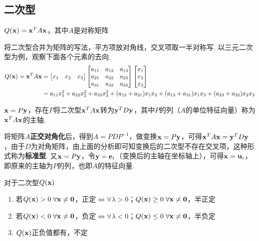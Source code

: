 \subsection{二次型}
\begin{definition}[二次型]
$Q(\mathbf{x})=\mathbf{x}^TA\mathbf{x}$，其中$A$是对称矩阵
\end{definition}
将二次型合并为矩阵的写法，平方项放对角线，交叉项取一半对称写. 以三元二次型为例，观察下面各个元素的去向.
\[\begin{aligned}Q(\mathbf{x})=\mathbf{x}^TA\mathbf{x}&=\begin{bmatrix}x_1&x_2&x_3\end{bmatrix}\begin{bmatrix}a_{11}&a_{12}&a_{13}\\a_{21}&a_{22}&a_{23}\\a_{31}&a_{32}&a_{33}\end{bmatrix}\begin{bmatrix}x_1\\x_2\\x_3\end{bmatrix}\\
&=a_{11}x_1^2+a_{22}x_2^2+a_{33}x_3^2+(a_{12}+a_{21})x_1x_2+(a_{13}+a_{31})x_1x_3+(a_{23}+a_{32})x_2x_3\end{aligned}\]
\begin{theorem}[主轴定理]
$\mathbf{x}=P\mathbf{y}$，存在$P$将二次型$\mathbf{x}^TA\mathbf{x}$转为$\mathbf{y}^TD\mathbf{y}$，其中$P$的列（$A$的单位特征向量）称为$\mathbf{x}^TA\mathbf{x}$的主轴.
\end{theorem}
\begin{myalgorithm}[标准型变换]
将矩阵$A$\textbf{正交对角化}后，得到$A=PDP^{-1}$，做变换$\mathbf{x}=P\mathbf{y}$，可得$\mathbf{x}^TA\mathbf{x}=\mathbf{y}^TD\mathbf{y}$，由于$D$为对角矩阵，由上面的分析即可知变换后的二次型不存在交叉项，这种形式称为\textbf{标准型}. 又$\mathbf{x}=P\mathbf{y}$，令$\mathbf{y}=\mathbf{e}_i$（变换后的主轴在坐标轴上），可得$\mathbf{x}=\mathbf{u}_i$，即原来的主轴为$P$的列，也即$A$的特征向量.
\end{myalgorithm}
\begin{definition}
对于二次型$Q(\mathbf{x})$
\begin{enumerate}
	\itemsep -3pt
	\item 若$Q(\mathbf{x})>0\;\forall \mathbf{x}\ne\mathbf{0}$，正定$\iff\forall\lambda>0$；$Q(\mathbf{x})\geq0\;\forall \mathbf{x}\ne\mathbf{0}$，半正定
	\item 若$Q(\mathbf{x})<0\;\forall \mathbf{x}\ne\mathbf{0}$，负定$\iff\forall\lambda<0$；$Q(\mathbf{x})\leq0\;\forall \mathbf{x}\ne\mathbf{0}$，半负定
	\item $Q(\mathbf{x})$正负值都有，不定
\end{enumerate}
\end{definition}
